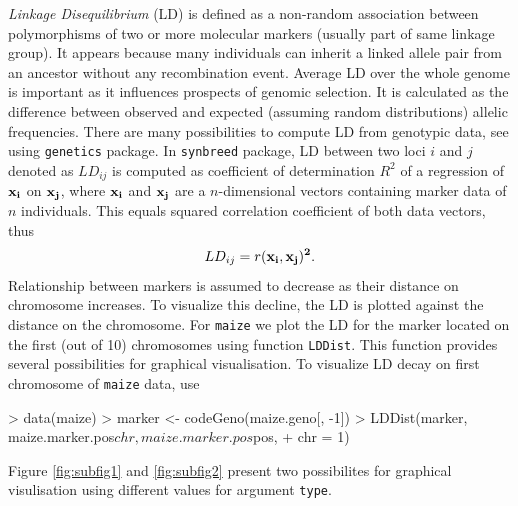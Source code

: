 \documentclass[a4paper,11pt]{article}
\begin{document}
\textit{Linkage Disequilibrium} (LD) is defined as a non-random association between polymorphisms of two or more molecular markers (usually part of same linkage group). It appears because many individuals can inherit a linked allele pair from an ancestor without any recombination event.  Average LD over the whole genome is important as it influences prospects of genomic selection. 
It is calculated as the difference between observed and expected (assuming random distributions) allelic frequencies. There are many possibilities to compute LD from genotypic data, see \citet{Foulkes2009} using \texttt{genetics} package. In \texttt{synbreed} package, LD between two loci $i$ and $j$ denoted as $LD_{ij}$
is computed as coefficient of determination $R^2$ of a regression of $\bf x_i$ on $\bf x_j$, where $\bf x_i$ and $\bf x_j$ are a $n$-dimensional vectors containing marker data of $n$ individuals. This equals squared correlation coefficient of both data vectors, thus
$$  LD_{ij} = r(\bf x_i,\bf x_j)^2 .$$
Relationship between markers is assumed to decrease as their distance on chromosome increases. To visualize this decline, the LD is plotted against the distance on the chromosome. 
For \texttt{maize} we plot the LD for the marker located on the first (out of 10) chromosomes using function \texttt{LDDist}. This function provides several possibilities for graphical visualisation. To visualize LD decay on first chromosome of \texttt{maize} data, use
\begin{Schunk}
\begin{Sinput}
> data(maize)
> marker <- codeGeno(maize.geno[, -1])
> LDDist(marker, maize.marker.pos$chr, maize.marker.pos$pos, 
+     chr = 1)
\end{Sinput}
\end{Schunk}
Figure \ref{fig:subfig1} and  \ref{fig:subfig2} present two possibilites for graphical visulisation using different values for argument \texttt{type}.
\end{document}
